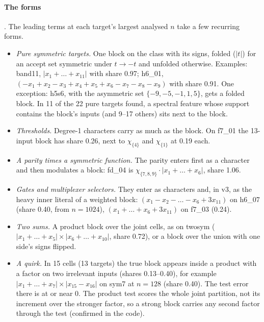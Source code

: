 \paragraph{The forms} . The leading terms at each target's largest analysed $n$ take a few recurring forms.
\begin{itemize}
\item \emph{Pure symmetric targets.} One block on the class with its signs, folded ($|t|$) for an accept set symmetric under $t\to-t$ and unfolded otherwise. Examples: band11, $|x_1+\dots+x_{11}|$ with share 0.97; h6\_01, $(-x_1+x_2-x_3+x_4+x_5+x_6-x_7-x_8-x_9)$ with share 0.91. One exception: h5s6, with the asymmetric set $\{-9,-5,-1,1,5\}$, gets a folded block. In 11 of the 22 pure targets found, a spectral feature whose support contains the block's inputs (and 9--17 others) sits next to the block.
\item \emph{Thresholds.} Degree-1 characters carry as much as the block. On f7\_01 the 13-input block has share 0.26, next to $\chi_{\{4\}}$ and $\chi_{\{1\}}$ at 0.19 each.
\item \emph{A parity times a symmetric function.} The parity enters first as a character and then modulates a block: fd\_04 is $\chi_{\{7,8,9\}}\cdot|x_1+\dots+x_6|$, share 1.06.
\item \emph{Gates and multiplexer selectors.} They enter as characters and, in v3, as the heavy inner literal of a weighted block: $(x_1-x_2-\dots-x_6+3x_{11})$ on h6\_07 (share 0.40, from $n=1024$), $(x_1+\dots+x_6+3x_{11})$ on f7\_03 (0.24).
\item \emph{Two sums.} A product block over the joint cells, as on twosym ($|x_1+\dots+x_5|\times|x_6+\dots+x_{10}|$, share 0.72), or a block over the union with one side's signs flipped.
\item \emph{A quirk.} In 15 cells (13 targets) the true block appears inside a product with a factor on two irrelevant inputs (shares 0.13--0.40), for example $|x_1+\dots+x_7|\times|x_{15}-x_{16}|$ on sym7 at $n=128$ (share 0.40). The test error there is at or near 0. The product test scores the whole joint partition, not its increment over the stronger factor, so a strong block carries any second factor through the test (confirmed in the code).
\end{itemize}

